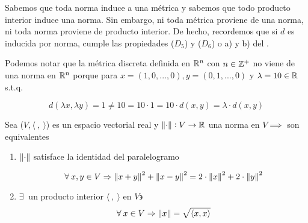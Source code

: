 \begin{remark}
    Sabemos que toda norma induce a una métrica y sabemos que todo producto interior induce una norma. Sin embargo, ni toda métrica proviene de una norma, ni toda norma proviene de producto interior. De hecho, recordemos que si $d$ es inducida por norma, cumple las propiedades ($D_5$) y ($D_6$) o a) y b) del . 

    Podemos notar que la métrica discreta definida en $\mathbb{R}^n$ con $n \in {\ensuremath{\mathbb{Z}}}^{+}$ no viene de una norma en $\mathbb{R}^n$ porque para $x=(1,0,...,0), y =(0,1,...,0)$ y $\lambda = 10 \in \mathbb{R}$ s.t.q.

    \begin{equation*}
        d(\lambda x , \lambda y) = 1 \neq  10 = 10 \cdot 1 = 10 \cdot d(x,y) = \lambda \cdot d(x,y)
    \end{equation*}
\end{remark}

\begin{theorem}\label{theom5}
    Sea ($V, \langle \: , \: \rangle$) es un espacio vectorial real y $\norm{\cdot} : V \to \mathbb{R}$ una norma en $V \implies$ son equivalentes 
    \begin{enumerate}
        \item $\norm{\cdot}$ satisface la identidad del paralelogramo

        \begin{equation*}
            \forall \: x,y \in V \Rightarrow {\norm{x+y}}^{2}+{\norm{x-y}}^{2} = 2 \cdot {\norm{x}}^{2} + 2 \cdot {\norm{y}}^{2}
        \end{equation*}
        \item $\exists \: $ un producto interior $\langle \: , \: \rangle $ en $V \backepsilon$
        \begin{equation*}
            \forall \: x \in V \Rightarrow \norm{x} = \sqrt{\langle x , x  \rangle}
        \end{equation*}
    \end{enumerate}
\end{theorem}

